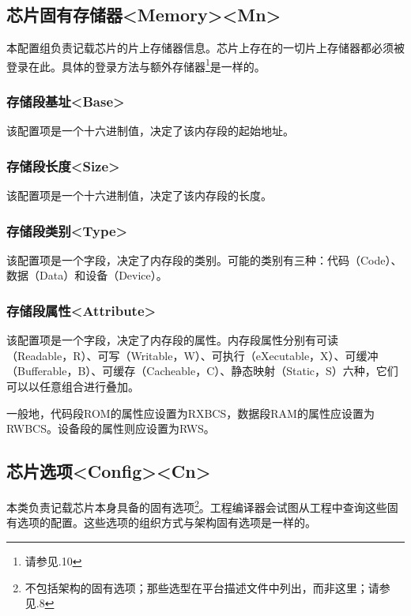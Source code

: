 \subsection{芯片固有存储器<Memory><Mn>{}}\label{subsec:5-5-12}

本配置组负责记载芯片的片上存储器信息。芯片上存在的一切片上存储器都必须被登录在此。具体的登录方法与额外存储器\footnote{请参见.10}是一样的。

\subsubsection{存储段基址<Base>{}}\label{subsubsec:5-5-12-1}

该配置项是一个十六进制值，决定了该内存段的起始地址。

\subsubsection{存储段长度<Size>{}}\label{subsubsec:5-5-12-2}

该配置项是一个十六进制值，决定了该内存段的长度。

\subsubsection{存储段类别<Type>{}}\label{subsubsec:5-5-12-3}

该配置项是一个字段，决定了内存段的类别。可能的类别有三种：代码（Code）、数据（Data）和设备（Device）。

\subsubsection{存储段属性<Attribute>{}}\label{subsubsec:5-5-12-4}

该配置项是一个字段，决定了内存段的属性。内存段属性分别有可读（Readable，R）、可写（Writable，W）、可执行（eXecutable，X）、可缓冲（Bufferable，B）、可缓存（Cacheable，C）、静态映射（Static，S）六种，它们可以以任意组合进行叠加。

一般地，代码段ROM的属性应设置为RXBCS，数据段RAM的属性应设置为RWBCS。设备段的属性则应设置为RWS。

\subsection{芯片选项<Config><Cn>{}}\label{subsec:5-5-13}

本类负责记载芯片本身具备的固有选项\footnote{不包括架构的固有选项；那些选型在平台描述文件中列出，而非这里；请参见.8}。工程编译器会试图从工程中查询这些固有选项的配置。这些选项的组织方式与架构固有选项是一样的。

